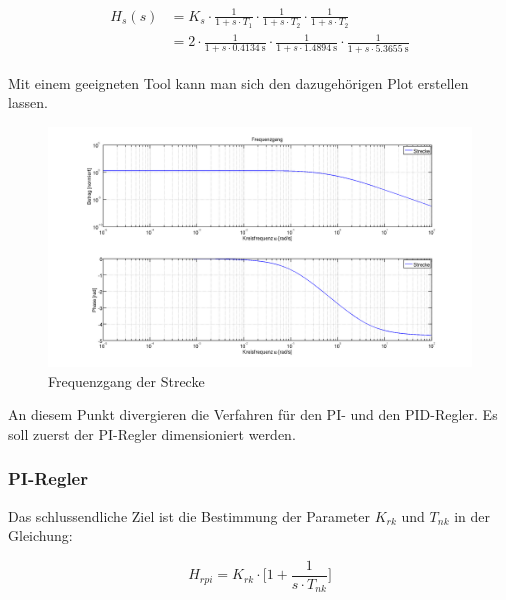\begin{gather} \label{eq:transfer:plant}
    \begin{split}
        H_s (s) & = K_s
                  \cdot \frac{1}{1 + s \cdot T_1}
                  \cdot \frac{1}{1 + s \cdot T_2}
                  \cdot \frac{1}{1 + s \cdot T_2}                     \\
                & = 2
                  \cdot \frac{1}{1 + s \cdot \SI{0.4134}{\second}}
                  \cdot \frac{1}{1 + s \cdot \SI{1.4894}{\second}}
                  \cdot \frac{1}{1 + s \cdot \SI{5.3655}{\second}}
    \end{split}
\end{gather}

Mit einem  geeigneten Tool  kann man sich  den dazugeh\"origen  Plot erstellen
lassen.

\begin{figure}[h! width=\pagewidth]
    \includegraphics[width=.9\textwidth]{images/streckeFrequenzgang.png}
    \caption{%
        Frequenzgang der Strecke%
    }
    \label{fig:plant_freq}
\end{figure}

An diesem Punkt divergieren die Verfahren f\"ur den PI- und den PID-Regler. Es
soll zuerst der PI-Regler dimensioniert werden.

\subsubsection*{PI-Regler}

Das schlussendliche Ziel ist die Bestimmung der Parameter $K_{rk}$ und $T_{nk}$
in der Gleichung:

\begin{equation} \label{eq:pi:target}
    H_{rpi} = K_{rk} \cdot \biggl[ 1 + \frac{1}{s \cdot T_{nk}} \biggr]
\end{equation}

